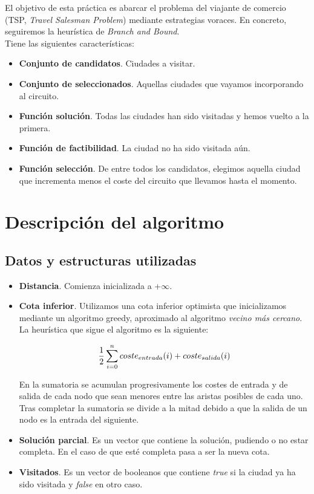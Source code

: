 \documentclass[12pt,spanish]{article}
\begin{document}
El objetivo de esta práctica es abarcar el problema del viajante de comercio (TSP, \textit{Travel Salesman Problem}) mediante estrategias voraces. En concreto, seguiremos la heurística de \textit{Branch and Bound}.\\

Tiene las siguientes características:
\begin{itemize}
	\item \textbf{Conjunto de candidatos}. Ciudades a visitar.
	\item \textbf{Conjunto de seleccionados}. Aquellas ciudades que vayamos incorporando al circuito.
	\item \textbf{Función solución}. Todas las ciudades han sido visitadas y hemos vuelto a la primera.
	\item \textbf{Función de factibilidad}. La ciudad no ha sido visitada aún.
	\item \textbf{Función selección}. De entre todos los candidatos, elegimos aquella ciudad que incrementa menos el coste del circuito que llevamos hasta el momento. 
\end{itemize}

\section{Descripción del algoritmo}

\subsection{Datos y estructuras utilizadas}

\begin{itemize}
	\item \textbf{Distancia}. Comienza inicializada a +$\infty$.
	\item \textbf{Cota inferior}. Utilizamos una cota inferior optimista que inicializamos mediante un algoritmo greedy, aproximado al algoritmo \textit{vecino más cercano}. La heurística que sigue el algoritmo es la siguiente:

\[
\centering \frac{1}{2} \sum_{i=0}^{n}coste_{entrada}(i)+coste_{salida}(i)
\]

En la sumatoria se acumulan progresivamente los costes de entrada y de salida de cada nodo que sean menores entre las aristas posibles de cada uno. Tras completar la sumatoria se divide a la mitad debido a que la salida de un nodo es la entrada del siguiente.
	\item \textbf{Solución parcial}. Es un vector que contiene la solución, pudiendo o no estar completa. En el caso de que esté completa pasa a ser la nueva cota.
	\item \textbf{Visitados}. Es un vector de booleanos que contiene \textit{true} si la ciudad ya ha sido visitada y \textit{false} en otro caso.

\end{itemize}
\end{document}
